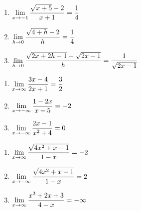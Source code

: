 \begin{enumerate}
\setcounter{enumi}{\value{HW}}

 \item  $\displaystyle{ \lim_{x \rightarrow -1} \dfrac{\sqrt{x+5} - 2 }{x+1}  = \frac{1}{4}}$  
 
 \medskip
 
 \item $\displaystyle{\lim_{h \rightarrow 0} \dfrac{\sqrt{4+h} - 2}{h}} = \frac{1}{4}$
 
 \medskip
   
 \item  $\displaystyle{ \lim_{h \rightarrow 0} \dfrac{\sqrt{2x+2h-1} - \sqrt{2x-1} }{h}  = \frac{1}{\sqrt{2x-1}}}$  

\medskip

\setcounter{HW}{\value{enumi}}
\end{enumerate}

\begin{enumerate}
\setcounter{enumi}{\value{HW}}

\item  $\displaystyle{ \lim_{x \rightarrow \infty} \dfrac{3x-4}{2x+1} = \frac{3}{2}}$

\medskip

\item $\displaystyle{ \lim_{x \rightarrow -\infty}  \dfrac{1-2x}{x-5} = -2}$ 

\medskip

\item $\displaystyle{ \lim_{x \rightarrow -\infty}\dfrac{2x-1}{x^2+4} = 0}$

\medskip

\setcounter{HW}{\value{enumi}}
\end{enumerate}

\begin{enumerate}
\setcounter{enumi}{\value{HW}}
\item $\displaystyle{ \lim_{x \rightarrow \infty}\dfrac{\sqrt{4x^2+x-1}}{1-x} = -2}$

\medskip

\item $\displaystyle{ \lim_{x \rightarrow -\infty}\dfrac{\sqrt{4x^2+x-1}}{1-x}  = 2}$

\medskip

\item $\displaystyle{ \lim_{x \rightarrow \infty} \dfrac{x^2+2x+3}{4-x} = -\infty}$

\medskip

\setcounter{HW}{\value{enumi}}
\end{enumerate}


